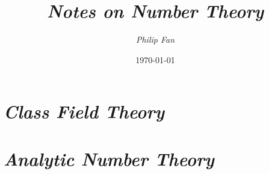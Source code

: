 \documentclass[10pt, a4paper]{book}
\title{\emph{\textbf{Notes on Number Theory}}}
\author{\emph{Philip Fan}}
\date{\today}
\begin{document}
\maketitle
\makecontents



\part{\emph{Class Field Theory}}



\part{\emph{Analytic Number Theory}}

\end{document}

